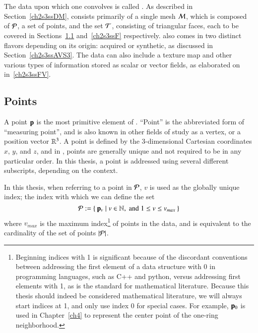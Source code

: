 \section{\tdd}
\label{ch2s3}
The data upon which one convolves  is called \tdd{}. As described in Section~\ref{ch2s3ssDM}, \tdd{} consists primarily of a single mesh $\mathcal{M}$, which is composed of $\mathcal{P}$, a set of points, and the set $\mathcal{T}$, consisting of triangular faces, each to be covered in Sections~\ref{ch2s3ssP} and~\ref{ch2s3ssF} respectively. \tdd{} also comes in two distinct flavors depending on its origin: acquired or synthetic, as discussed in Section~\ref{ch2s3ssAVS3}. The data can also include a texture map and other various types of information stored as scalar or vector fields, as elaborated on in~\ref{ch2s3ssFV}.

%
%
%
%
\subsection{Points}
\label{ch2s3ssP}
A point $\mathbf{p}$ is the most primitive element of \tdd{}. ``Point'' is the abbreviated form of ``measuring point'', and is also known in other fields of study as a vertex, or a position vector $\mathbb{R}^{3}$. A point is defined by the 3-dimensional Cartesian coordinates $x$, $y$, and $z$, and in \tdd{}, points are generally unique and not required to be in any particular order. In this thesis, a point is addressed using several different subscripts, depending on the context.

In this thesis, when referring to a point in $\mathcal{P}$, $v$ is used as the globally unique index; the index with which we can define the set
%
\begin{equation}
	\mathcal{P} := \left \{\:\mathbf{p}_v \mid v \in \mathbb{N}, \;\text{and}\; 1\leq v \leq v_{max}\:\right \}
	\label{eq:defineSetOfPoints}
\end{equation}
%
where $v_{max}$ is the maximum index\footnote{\label{indicesFootnote}Beginning indices with 1 is significant because of the discordant conventions between addressing the first element of a data structure with 0 in programming languages, such as C++ and python, versus addressing first elements with 1, as is the standard for mathematical literature. Because this thesis should indeed be considered mathematical literature, we will always start indices at 1, and only use index 0 for special cases. For example, $\mathbf{p}_0$ is used in Chapter~\ref{ch4} to represent the center point of the one-ring neighborhood.} of points in the data, and is equivalent to the cardinality of the set of points $|\mathcal{P}|$.%
%
%


